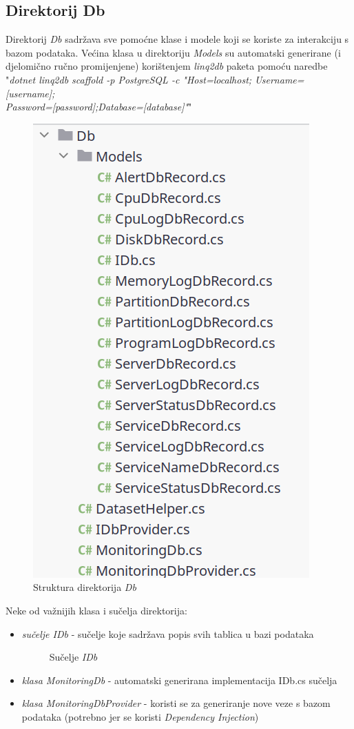 \documentclass[zavrsnirad]{fer}
\begin{document}
\subsection{Direktorij Db}
\label{pog:db_dir}
Direktorij \textit{Db} sadržava sve pomoćne klase i modele koji se koriste za interakciju s bazom podataka. Većina klasa u direktoriju \textit{Models} su automatski generirane (i djelomično ručno promijenjene) korištenjem \textit{linq2db} paketa pomoću naredbe "\textit{dotnet linq2db scaffold -p PostgreSQL -c "Host=localhost; Username=[username];\\Password=[password];Database=[database]"}"

\begin{figure}[htb!]
	\centering
	\includegraphics[width=0.5\linewidth]{images/db_dir_structure.png} 
	\caption{Struktura direktorija \textit{Db}}
	\label{slk:db_dir_structure}
\end{figure}
\FloatBarrier

Neke od važnijih klasa i sučelja direktorija:
\begin{itemize}
	\item \textit{sučelje IDb} - sučelje koje sadržava popis svih tablica u bazi podataka
	\begin{figure}[htb]
		\centering
		
		\caption{Sučelje \textit{IDb}}
	\end{figure}
	\FloatBarrier
	\item \textit{klasa MonitoringDb} - automatski generirana implementacija IDb.cs sučelja
	\item \textit{klasa MonitoringDbProvider} - koristi se za generiranje nove veze s bazom podataka (potrebno jer se koristi \textit{Dependency Injection})
\end{itemize}
\end{document}

